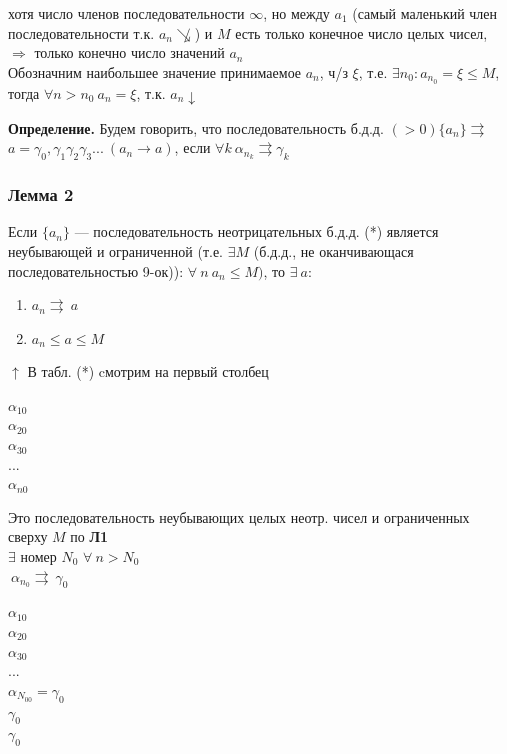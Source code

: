 \documentclass{article}
\begin{document}
    хотя число членов последовательности \(\infty\), но между \(a_1\) (самый маленький член последовательности т.к. \( a_n \not\searrow \)) и \(M\) есть только конечное число целых чисел, \(\Rightarrow\) только конечно число значений \(a_n\)\\
    Обозначним наибольшее значение принимаемое \( a_n \), ч/з \( \xi \), т.е. \( \exists n_0: a_{n_0} = \xi \leq M \), тогда \( \forall n > n_0\ a_n = \xi \), т.к. \( a_n \downarrow \)
    
    \textbf{Определение.} Будем говорить, что последовательность б.д.д. \( (>0) \{a_n\} \rightrightarrows \)\\
    \( a = \gamma_0,\gamma_1\gamma_2\gamma_3...\ (a_n \rightarrow a) \), если \(\forall k \ \alpha_{n_k} \rightrightarrows \gamma_k\)

    \subsubsection{Лемма 2}
    
    Если \( \{a_n\} \) --- последовательность неотрицательных б.д.д. (*) является неубывающей и ограниченной (т.е. \( \exists M \) (б.д.д., не оканчивающася последовательностью 9-ок)): \( \forall\ n\ a_n \leq M) \), то \( \exists\ a \):
    
    \begin{enumerate}
    	\item \(a_n \rightrightarrows\ a\)  

    	\item \(a_n \leq a \leq M\)
	\end{enumerate}
    
    \( \uparrow \) В табл. (*) cмотрим на первый столбец

    \( \alpha_{10} \)\\
    \( \alpha_{20} \)\\
    \( \alpha_{30} \)\\
    ...\\
    \( \alpha_{n0} \)

    Это последовательность неубывающих целых неотр. чисел и ограниченных сверху \(M\) по \textbf{Л1}\\
    \(\exists \) номер \(N_0\) \: \(\forall\ n > N_0\)\\
    \(\ \alpha_{n_0} \rightrightarrows\ \gamma_0\)
    
    \( \alpha_{10} \)\\
    \( \alpha_{20} \)\\
    \( \alpha_{30} \)\\
    ...\\
    \( \alpha_{N_00} = \gamma_0 \)\\
    \(\gamma_0\)\\
    \(\gamma_0\)
\end{document}

